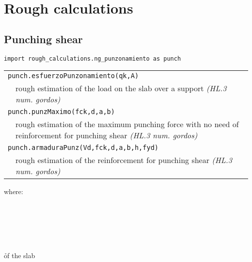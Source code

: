 \chapter{Rough calculations}
\section{Punching shear} 
\begin{verbatim}
import rough_calculations.ng_punzonamiento as punch
\end{verbatim}
\begin{center}
\begin{tabular}{p{3cm}p{9.5cm}}
\multicolumn{2}{l}{{\tt punch.esfuerzoPunzonamiento(qk,A)}} \\
& rough estimation of the load on the slab over a support \emph{(HL.3 num. gordos)}\\
\multicolumn{2}{l}{{\tt punch.punzMaximo(fck,d,a,b)}} \\
& rough estimation of the maximum punching force with no need of reinforcement for punching shear  \emph{(HL.3 num. gordos)}\\
\multicolumn{2}{l}{{\tt punch.armaduraPunz(Vd,fck,d,a,b,h,fyd)}} \\
& rough estimation of the reinforcement for punching shear  \emph{(HL.3 num. gordos)} \\
\end{tabular}
\end{center}

where:
\begin{paramFuncTable}
\qkSlab{} \\
\ASupport{} \\
\fck{}\\
 \\
\abSupport{} \\
\h{of the slab} \\
 \\
\end{paramFuncTable}

